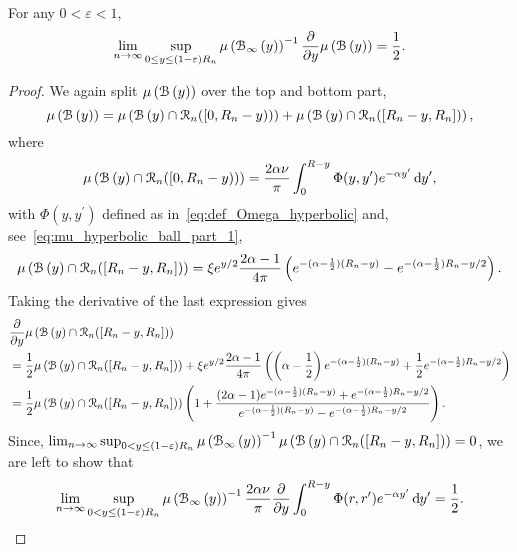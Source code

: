 \begin{lemma}
For any $0 < \varepsilon < 1$,
\[
	\lim_{n \to \infty} \sup_{0 \le y \le (1-\varepsilon)R_n} \mu\left({\mathcal B}_{\infty}\left(y\right)\right)^{-1}
	\frac{\partial}{\partial y} \mu\left({\mathcal B}\left(y\right)\right) 
	= \frac{1}{2}.
\]
\end{lemma}

\begin{proof}
We again split $\mu\left({\mathcal B}\left(y\right)\right)$ over the top and bottom part,
\[
	\mu\left({\mathcal B}\left(y\right)\right) 
	= \mu\left({\mathcal B}\left(y\right) \cap {\mathcal R}_n ([0,R_n - y))\right) + \mu\left({\mathcal B}\left(y\right) \cap {\mathcal R}_n ([R_n - y, R_n])\right),
\]
where
\[
	\mu\left({\mathcal B}\left(y\right) \cap {\mathcal R}_n ([0,R_n - y))\right) = \frac{2\alpha \nu}{\pi}\int_0^{R - y} \Phi(y,y^\prime) 
		e^{-\alpha y^\prime} \operatorname{\mathrm{d}\hspace{-2pt}} y^\prime,
\]
with $\Phi(y,y^\prime)$ defined as in~\eqref{eq:def_Omega_hyperbolic} and, see~\eqref{eq:mu_hyperbolic_ball_part_1},
\[
	\mu\left({\mathcal B}\left(y\right) \cap {\mathcal R}_n ([R_n - y, R_n])\right)
	= \xi e^{y/2}\frac{2\alpha - 1}{4\pi} \left( e^{-(\alpha - \frac{1}{2})(R_n - y)}
	- e^{-(\alpha - \frac{1}{2})R_n - y/2}\right).
\]
Taking the derivative of the last expression gives
\begin{align*}
	&\frac{\partial}{\partial y} \mu\left({\mathcal B}\left(y\right) \cap {\mathcal R}_n ([R_n - y, R_n])\right)\\
	&= \frac{1}{2}\mu\left({\mathcal B}\left(y\right) \cap {\mathcal R}_n ([R_n - y, R_n])\right)
		+ \xi e^{y/2}\frac{2\alpha - 1}{4\pi}\left(
		\left(\alpha - \frac{1}{2}\right)e^{-(\alpha - \frac{1}{2})(R_n - y)} 
		+ \frac{1}{2}e^{-(\alpha - \frac{1}{2})R_n - y/2}\right)\\
	&= \frac{1}{2}\mu\left({\mathcal B}\left(y\right) \cap {\mathcal R}_n ([R_n - y, R_n])\right)\left(1 +
		\frac{(2\alpha - 1)e^{-(\alpha - \frac{1}{2})(R_n - y)} + e^{-(\alpha - \frac{1}{2})R_n - y/2}}
		{e^{-(\alpha - \frac{1}{2})(R_n - y)} - e^{-(\alpha - \frac{1}{2})R_n - y/2}}\right).
\end{align*}
Since, $\lim_{n \to \infty} \sup_{0 < y \le (1-\varepsilon)R_n} \mu\left({\mathcal B}_{\infty}\left(y\right)\right)^{-1} \mu\left({\mathcal B}\left(y\right) \cap {\mathcal R}_n ([R_n - y, R_n])\right) = 0$, we are left to show that
\begin{equation}\label{eq:derivative_mu_hyp_ball_main}
	\lim_{n \to \infty} \sup_{0 < y \le (1-\varepsilon)R_n} \mu\left({\mathcal B}_{\infty}\left(y\right)\right)^{-1} \frac{2\alpha \nu}{\pi} \frac{\partial}{\partial y} \int_0^{R - y} \Phi(r,r^\prime) e^{-\alpha y^\prime} \operatorname{\mathrm{d}\hspace{-2pt}} y^\prime
	= \frac{1}{2}.
\end{equation}


\end{proof}
